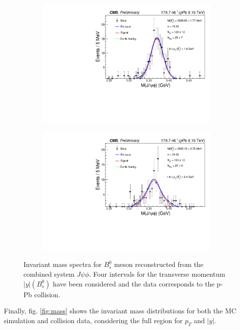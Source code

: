 \begin{figure}
\begin{subfigure}[b]{0.475\textwidth}
		\includegraphics[width=\textwidth]{MainContent/Figs/mass/mass_BsFit_ybins_1.0_1.6.PDF}
		\caption{}
	\end{subfigure}
	\hfill
	\begin{subfigure}[b]{0.475\textwidth}
		\centering
		\includegraphics[width=\textwidth]{MainContent/Figs/mass/mass_BsFit_ybins_1.6_2.4.PDF}
		\caption{}%
	\end{subfigure}
	\caption{Invariant mass spectra for $B^0_s$ meson reconstructed from the combined system $J\psi\phi$. Four intervals for the transverse momentum $|y|(B^0_s)$ have been considered and the data corresponds to the p-Pb collision.}
	\label{fig:mass_ybins}
\end{figure}


Finally, fig. \ref{fig:mass} shows the invariant mass distributions for both the MC simulation and collision data, considering the full region for $p_T$ and $|y|$. 

